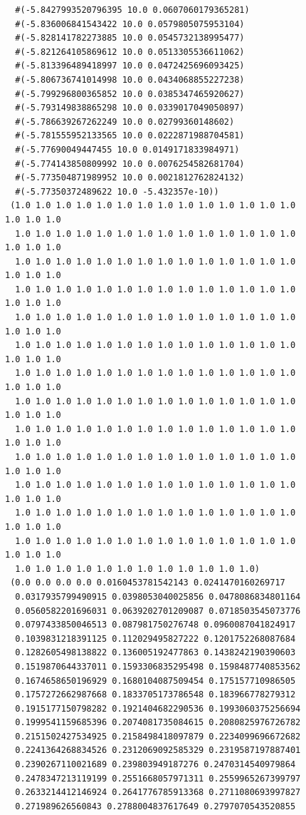 \documentclass [11pt]{book}
\begin{document}
\begin{itemize}
\begin{figure}
\begin{lrbox}{\boxedverb}
\begin{minipage}{\linewidth}
{\begin{verbatim}
  #(-5.8427993520796395 10.0 0.0607060179365281)
  #(-5.836006841543422 10.0 0.0579805075953104)
  #(-5.828141782273885 10.0 0.0545732138995477)
  #(-5.821264105869612 10.0 0.0513305536611062)
  #(-5.813396489418997 10.0 0.0472425696093425)
  #(-5.806736741014998 10.0 0.0434068855227238)
  #(-5.799296800365852 10.0 0.0385347465920627)
  #(-5.793149838865298 10.0 0.0339017049050897)
  #(-5.786639267262249 10.0 0.02799360148602)
  #(-5.781555952133565 10.0 0.0222871988704581)
  #(-5.77690049447455 10.0 0.0149171833984971)
  #(-5.774143850809992 10.0 0.0076254582681704)
  #(-5.773504871989952 10.0 0.0021812762824132)
  #(-5.77350372489622 10.0 -5.432357e-10))
 (1.0 1.0 1.0 1.0 1.0 1.0 1.0 1.0 1.0 1.0 1.0 1.0 1.0 1.0 1.0 1.0 1.0
  1.0 1.0 1.0 1.0 1.0 1.0 1.0 1.0 1.0 1.0 1.0 1.0 1.0 1.0 1.0 1.0 1.0
  1.0 1.0 1.0 1.0 1.0 1.0 1.0 1.0 1.0 1.0 1.0 1.0 1.0 1.0 1.0 1.0 1.0
  1.0 1.0 1.0 1.0 1.0 1.0 1.0 1.0 1.0 1.0 1.0 1.0 1.0 1.0 1.0 1.0 1.0
  1.0 1.0 1.0 1.0 1.0 1.0 1.0 1.0 1.0 1.0 1.0 1.0 1.0 1.0 1.0 1.0 1.0
  1.0 1.0 1.0 1.0 1.0 1.0 1.0 1.0 1.0 1.0 1.0 1.0 1.0 1.0 1.0 1.0 1.0
  1.0 1.0 1.0 1.0 1.0 1.0 1.0 1.0 1.0 1.0 1.0 1.0 1.0 1.0 1.0 1.0 1.0
  1.0 1.0 1.0 1.0 1.0 1.0 1.0 1.0 1.0 1.0 1.0 1.0 1.0 1.0 1.0 1.0 1.0
  1.0 1.0 1.0 1.0 1.0 1.0 1.0 1.0 1.0 1.0 1.0 1.0 1.0 1.0 1.0 1.0 1.0
  1.0 1.0 1.0 1.0 1.0 1.0 1.0 1.0 1.0 1.0 1.0 1.0 1.0 1.0 1.0 1.0 1.0
  1.0 1.0 1.0 1.0 1.0 1.0 1.0 1.0 1.0 1.0 1.0 1.0 1.0 1.0 1.0 1.0 1.0
  1.0 1.0 1.0 1.0 1.0 1.0 1.0 1.0 1.0 1.0 1.0 1.0 1.0 1.0 1.0 1.0 1.0
  1.0 1.0 1.0 1.0 1.0 1.0 1.0 1.0 1.0 1.0 1.0 1.0 1.0 1.0 1.0 1.0 1.0
  1.0 1.0 1.0 1.0 1.0 1.0 1.0 1.0 1.0 1.0 1.0 1.0)
 (0.0 0.0 0.0 0.0 0.0160453781542143 0.0241470160269717
  0.0317935799490915 0.0398053040025856 0.0478086834801164
  0.0560582201696031 0.0639202701209087 0.0718503545073776
  0.0797433850046513 0.087981750276748 0.0960087041824917
  0.1039831218391125 0.112029495827222 0.1201752268087684
  0.1282605498138822 0.136005192477863 0.1438242190390603
  0.1519870644337011 0.1593306835295498 0.1598487740853562
  0.1674658650196929 0.1680104087509454 0.175157710986505
  0.1757272662987668 0.1833705173786548 0.183966778279312
  0.1915177150798282 0.1921404682290536 0.1993060375256694
  0.1999541159685396 0.2074081735084615 0.2080825976726782
  0.2151502427534925 0.2158498418097879 0.2234099696672682
  0.2241364268834526 0.2312069092585329 0.2319587197887401
  0.2390267110021689 0.239803949187276 0.2470314540979864
  0.2478347213119199 0.2551668057971311 0.2559965267399797
  0.2633214412146924 0.2641776785913368 0.2711080693997827
  0.271989626560843 0.2788004837617649 0.2797070543520855

\end{verbatim}}
\end{minipage}
\end{lrbox}
\end{figure}
\end{itemize}
\end{document}
